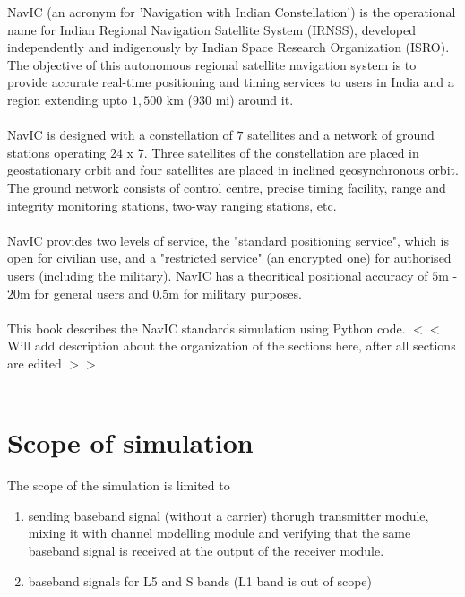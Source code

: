 




%


NavIC (an acronym for 'Navigation with Indian Constellation') is the operational name for Indian Regional Navigation Satellite System (IRNSS), developed independently and indigenously by Indian Space Research Organization (ISRO). The objective of this autonomous regional satellite navigation system is to provide accurate real-time positioning and timing services to users in India and a region extending upto $1,500$ km ($930$ mi) around it. 
\\
\\
NavIC is designed with a constellation of $7$ satellites and a network of ground stations operating $24$ x $7$. Three satellites of the constellation
are placed in geostationary orbit and four satellites are placed in inclined geosynchronous orbit. The ground network consists of control centre, precise timing facility, range and integrity monitoring stations, two-way ranging stations, etc.
\\
\\
NavIC provides two levels of service, the "standard positioning service", which is open for civilian use, and a "restricted service" (an encrypted one) for authorised users (including the military). NavIC has a theoritical positional accuracy of $5$m - $20$m for general users and $0.5$m for military purposes.
\\
\\
This book describes the NavIC standards simulation using Python code. $<<$ Will add description about the organization of the sections here, after all sections are edited $>>$
\\
\\
\section{Scope of simulation}	
The scope of the simulation is limited to 
\begin{enumerate}
	\item sending baseband signal (without a carrier) thorugh transmitter module, mixing it with channel modelling module and verifying that the same baseband signal is received at the output of the receiver module. 
	\item baseband signals for L5 and S bands (L1 band is out of scope)
\end{enumerate}



%

